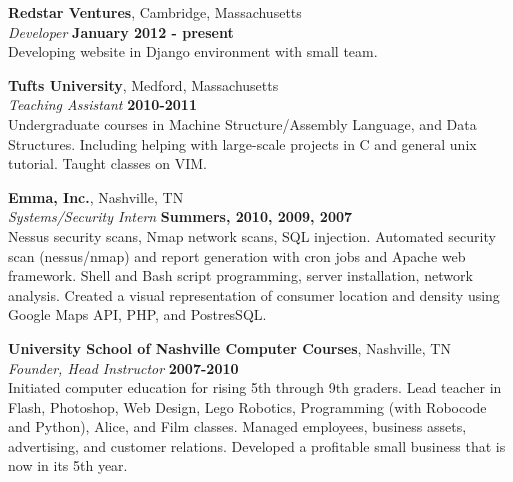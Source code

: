 \documentclass[margin,line]{resume}
\begin{document}
\begin{resume}
    \textbf{Redstar Ventures}, Cambridge, Massachusetts \vspace{2mm}\\\vspace{1mm}%
    \textsl{Developer} \hfill \textbf{January 2012 - present}\\
	Developing website in Django environment with small team.
	
    \textbf{Tufts University}, Medford, Massachusetts \vspace{2mm}\\\vspace{1mm}%
    \textsl{Teaching Assistant} \hfill \textbf{2010-2011}\\
    Undergraduate courses in Machine Structure/Assembly Language, and Data Structures. Including helping with large-scale projects in C and general unix tutorial. Taught classes on VIM.

    \textbf{Emma, Inc.}, Nashville, TN \vspace{2mm}\\\vspace{1mm}%
    \textsl{Systems/Security Intern} \hfill \textbf{Summers, 2010, 2009, 2007}\vspace{1.5mm}\\\vspace{0mm}%
	Nessus security scans, Nmap network scans, SQL injection. Automated security scan (nessus/nmap) and report generation with cron jobs and Apache web framework. Shell and Bash script programming, server installation, network analysis. Created a visual representation of consumer location and density using Google Maps API, PHP, and PostresSQL.
	
	\textbf{University School of Nashville Computer Courses}, Nashville, TN \vspace{2mm}\\\vspace{1mm}%
    \textsl{Founder, Head Instructor} \hfill \textbf{2007-2010}\vspace{1.5mm}\\\vspace{0mm}%
	Initiated computer education for rising 5th through 9th graders. Lead teacher in Flash, Photoshop, Web Design, Lego Robotics, Programming (with Robocode and Python), Alice, and Film classes. Managed employees, business assets, advertising, and customer relations. Developed a profitable small business that is now in its 5th year.



\end{resume}
\end{document}
